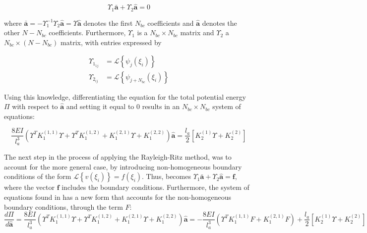 \begin{equation}
\label{eq:new_form_of_BC}
    \Upsilon_{1} \mathbf{\bar{a}}+\Upsilon_{2} \mathbf{\hat{a}}=0
\end{equation}

where $\mathbf{\bar{a}}=-\Upsilon_{1}^{-1} {\Upsilon}_{2} \hat{\mathbf{a}}=\Upsilon \hat{\mathbf{a}}$ denotes the first $N_{bc}$ coefficients and $\mathbf{\hat{a}}$ denotes the other $N-N_{bc}$ coefficients. Furthermore, $\Upsilon_{1}$ is a $N_{b c} \times N_{b c}$ matrix and $\Upsilon_{2}$ a $N_{b c} \times\left(N-N_{b c}\right)$ matrix, with entries expressed by

$$
\begin{aligned}
\Upsilon_{1_{1 j}} &=\mathcal{L}\left\{\psi_{j}\left(\xi_{i}\right)\right\} \\
\Upsilon_{2_{i j}} &=\mathcal{L}\left\{\psi_{j+N_{b c}}\left(\xi_{i}\right)\right\}
\end{aligned}
$$

Using this knowledge, differentiating the equation for the total potential energy $\Pi$ with respect to $\mathbf{\hat{a}}$ and setting it equal to 0 results in an $N_{b c} \times N_{b c}$ system of equations:

\begin{equation}
\label{eq:first_system}
    \frac{8 E I}{l_{a}^{3}}\left(\Upsilon^{T} K_{1}^{(1,1)} \Upsilon+\Upsilon^{T} K_{1}^{(1,2)}+K_{1}^{(2,1)} \Upsilon+K_{1}^{(2,2)}\right) \hat{\mathbf{a}}=\frac{l_{a}}{2}\left[K_{2}^{(1)} \Upsilon+K_{2}^{(2)}\right]
\end{equation}

The next step in the process of applying the Rayleigh-Ritz method, was to account for the more general case, by introducing non-homogeneous boundary conditions of the form $\mathcal{L}\left\{v\left(\xi_{i}\right)\right\}=f\left(\xi_{i}\right)$. Thus,  becomes $\Upsilon_{1} \mathbf{\bar{a}}+\Upsilon_{2} \mathbf{\hat{a}}=\mathbf{f}$, where the vector $\mathbf{f}$ includes the boundary conditions. Furthermore, the system of equations found in  has a new form that accounts for the non-homogeneous boundary conditions, through the term $F$:
\begin{equation}
    \label{eq:second_system}
    \frac{d \Pi}{d \hat{\mathbf{a}}}=\frac{8 E I}{l_{a}^{3}}\left(\Upsilon^{T} K_{1}^{(1,1)} {\Upsilon}+\Upsilon^{T} K_{1}^{(1,2)}+K_{1}^{(2,1)} {\Upsilon}+K_{1}^{(2,2)}\right) \hat{\mathbf{a}}=-\frac{8 E I}{l_{a}^{3}}\left({\Upsilon}^{T} K_{1}^{(1,1)} F+K_{1}^{(2,1)} F\right)+\frac{l_{a}}{2}\left[K_{2}^{(1)} {\Upsilon}+K_{2}^{(2)}\right]
\end{equation}

